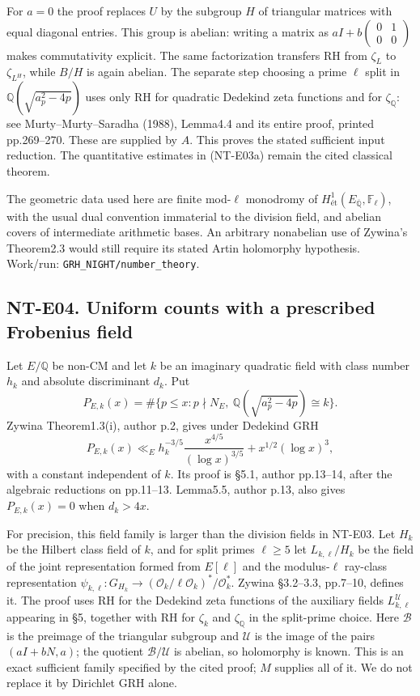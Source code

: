 For $a=0$ the proof replaces $U$ by the subgroup $H$ of triangular
matrices with equal diagonal entries. This group is abelian:
writing a matrix as $aI+b\left(\begin{smallmatrix}0&1\\0&0\end{smallmatrix}\right)$
makes commutativity explicit. The same factorization transfers RH
from $\zeta_L$ to $\zeta_{L^H}$, while $B/H$ is again abelian.
The separate step choosing a prime $\ell$ split in
$\mathbb Q(\sqrt{a_p^2-4p})$ uses only RH for quadratic Dedekind
zeta functions and for $\zeta_{\mathbb Q}$: see Murty--Murty--Saradha
(1988), Lemma4.4 and its entire proof, printed pp.269--270.
These are supplied by $A$. This proves the stated sufficient input
reduction. The quantitative estimates in (NT-E03a) remain the
cited classical theorem.

The geometric data used here are finite mod-$\ell$ monodromy of
$H^1_{\text{ét}}(E_{\overline{\mathbb Q}},\mathbb F_\ell)$, with
the usual dual convention immaterial to the division field, and
abelian covers of intermediate arithmetic bases. An arbitrary
nonabelian use of Zywina's Theorem2.3 would still require its stated
Artin holomorphy hypothesis. Work/run:
\texttt{GRH\_NIGHT/number\_theory}.

\subsection*{NT-E04. Uniform counts with a prescribed Frobenius field}
Let $E/\mathbb Q$ be non-CM and let $k$ be an imaginary quadratic
field with class number $h_k$ and absolute discriminant $d_k$.
Put
\[
 P_{E,k}(x)=\#\{p\le x:p\nmid N_E,\
            \mathbb Q(\sqrt{a_p^2-4p})\cong k\}.
\]
Zywina Theorem1.3(i), author p.2, gives under Dedekind GRH
\[
 P_{E,k}(x)\ll_E
   h_k^{-3/5}\frac{x^{4/5}}{(\log x)^{3/5}}
                   +x^{1/2}(\log x)^3,                    \tag{NT-E04a}
\]
with a constant independent of $k$. Its proof is \S5.1,
author pp.13--14, after the algebraic reductions on pp.11--13.
Lemma5.5, author p.13, also gives $P_{E,k}(x)=0$ when $d_k>4x$.

For precision, this field family is larger than the division
fields in NT-E03. Let $H_k$ be the Hilbert class field of $k$,
and for split primes $\ell\ge5$ let $L_{k,\ell}/H_k$ be the
field of the joint representation formed from $E[\ell]$ and
the modulus-$\ell$ ray-class representation
$\psi_{k,\ell}:G_{H_k}\to
(\mathcal O_k/\ell\mathcal O_k)^*/\mathcal O_k^*$.
Zywina \S3.2--3.3, pp.7--10, defines it. The proof uses RH for
the Dedekind zeta functions of the auxiliary fields
$L_{k,\ell}^{\mathcal U}$ appearing in \S5, together with RH
for $\zeta_k$ and $\zeta_{\mathbb Q}$ in the split-prime choice.
Here $\mathcal B$ is the preimage of the triangular subgroup and
$\mathcal U$ is the image of the pairs $(aI+bN,a)$; the quotient
$\mathcal B/\mathcal U$ is abelian, so holomorphy is known.
This is an exact sufficient family specified by the cited proof;
$M$ supplies all of it. We do not replace it by Dirichlet GRH alone.

